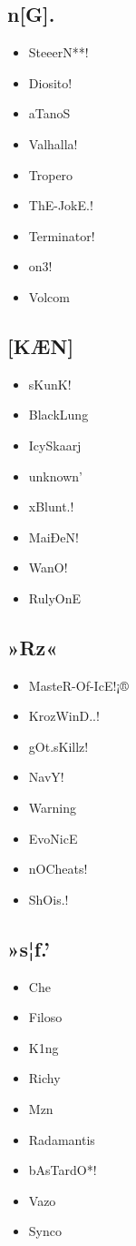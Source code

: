 \documentclass[a4paper, 11pt]{article}
\begin{document}
    \subsection{n[G].}
    \begin{itemize}
        \item SteeerN**!
        \item Diosito!
        \item aTanoS
        \item Valhalla!
        \item Tropero
        \item ThE-JokE.!
        \item Terminator!
        \item on3!
        \item Volcom
    \end{itemize}

    \subsection{[KÆN]}
    \begin{itemize}
        \item sKunK!
        \item BlackLung
        \item IcySkaarj
        \item unknown'
        \item xBlunt.!
        \item MaiÐeN!
        \item WanO!
        \item RulyOnE
    \end{itemize}

    \subsection{»Rz«}
    \begin{itemize}
        \item MasteR-Of-IcE!¡®
        \item KrozWinD..!
        \item gOt.sKillz!
        \item NavY!
        \item Warning
        \item EvoNicE
        \item nOCheats!
        \item ShOis.!
    \end{itemize}

    \subsection{»s¦ƒ.'}
    \begin{itemize}
        \item Che
        \item Filoso
        \item K1ng
        \item Richy
        \item Mzn
        \item Radamantis
        \item bAsTardO*!
        \item Vazo
        \item Synco
    \end{itemize}
\end{document}
